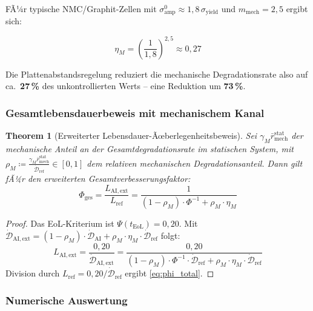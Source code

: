 ﻿\documentclass[12pt,a4paper]{article}
\newtheorem{theorem}{Theorem}[section]
\begin{document}
FÃ¼r typische NMC/Graphit-Zellen mit $\sigma_\mathrm{amp}^0 \approx 1{,}8\,\sigma_\mathrm{yield}$
und $m_\mathrm{mech} = 2{,}5$ ergibt sich:

\begin{equation}
	\eta_M = \left(\frac{1}{1{,}8}\right)^{2{,}5} \approx 0{,}27
\end{equation}

Die Plattenabstandsregelung reduziert die mechanische Degradationsrate
also auf ca.\ \textbf{27\,\%} des unkontrollierten Werts -- eine Reduktion
um \textbf{73\,\%}.

\subsubsection{Gesamtlebensdauerbeweis mit mechanischem Kanal}

\begin{theorem}[Erweiterter Lebensdauer-Ãœberlegenheitsbeweis]
	\label{thm:lifetime_mech}
	Sei $\gamma_M \bar{r}_\mathrm{mech}^\mathrm{stat}$ der mechanische Anteil
	an der Gesamtdegradationsrate im statischen System, mit
	$\rho_M \coloneqq \frac{\gamma_M \bar{r}_\mathrm{mech}^\mathrm{stat}}
	{\dot{\mathcal{D}}_\mathrm{ref}} \in [0,1]$ dem relativen mechanischen
	Degradationsanteil. Dann gilt fÃ¼r den erweiterten Gesamtverbesserungsfaktor:
	\begin{equation}
		\Phi_\mathrm{ges} = \frac{L_\mathrm{AI,ext}}{L_\mathrm{ref}}
		= \frac{1}{(1-\rho_M) \cdot \Phi^{-1} + \rho_M \cdot \eta_M}
		\label{eq:phi_total}
	\end{equation}
\end{theorem}

\begin{proof}
	Das EoL-Kriterium ist $\Psi(t_\mathrm{EoL}) = 0{,}20$. Mit
	$\dot{\mathcal{D}}_\mathrm{AI,ext} = (1-\rho_M) \cdot \dot{\mathcal{D}}_\mathrm{AI}
	+ \rho_M \cdot \eta_M \cdot \dot{\mathcal{D}}_\mathrm{ref}$ folgt:
	\[
	L_\mathrm{AI,ext} = \frac{0{,}20}{\dot{\mathcal{D}}_\mathrm{AI,ext}}
	= \frac{0{,}20}{(1-\rho_M) \cdot \Phi^{-1} \cdot \dot{\mathcal{D}}_\mathrm{ref}
		+ \rho_M \cdot \eta_M \cdot \dot{\mathcal{D}}_\mathrm{ref}}
	\]
	Division durch $L_\mathrm{ref} = 0{,}20 / \dot{\mathcal{D}}_\mathrm{ref}$
	ergibt \eqref{eq:phi_total}.
\end{proof}

\subsubsection{Numerische Auswertung}
\end{document}
